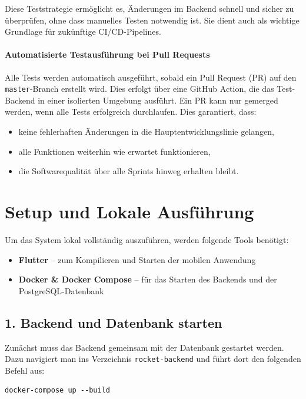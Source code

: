 \documentclass[11pt,a4paper]{article}
\begin{document}
Diese Teststrategie ermöglicht es, Änderungen im Backend schnell und sicher zu überprüfen, ohne dass manuelles Testen notwendig ist. Sie dient auch als wichtige Grundlage für zukünftige CI/CD-Pipelines.

\paragraph{Automatisierte Testausführung bei Pull Requests}
Alle Tests werden automatisch ausgeführt, sobald ein Pull Request (PR) auf den \texttt{master}-Branch erstellt wird. Dies erfolgt über eine GitHub Action, die das Test-Backend in einer isolierten Umgebung ausführt. Ein PR kann nur gemerged werden, wenn alle Tests erfolgreich durchlaufen. Dies garantiert, dass:
\begin{itemize}
    \item keine fehlerhaften Änderungen in die Hauptentwicklungslinie gelangen,
    \item alle Funktionen weiterhin wie erwartet funktionieren,
    \item die Softwarequalität über alle Sprints hinweg erhalten bleibt.
\end{itemize}

\section{Setup und Lokale Ausführung}

Um das System lokal vollständig auszuführen, werden folgende Tools benötigt:

\begin{itemize}
    \item \textbf{Flutter} -- zum Kompilieren und Starten der mobilen Anwendung
    \item \textbf{Docker \& Docker Compose} -- für das Starten des Backends und der PostgreSQL-Datenbank
\end{itemize}

\subsection*{1. Backend und Datenbank starten}

Zunächst muss das Backend gemeinsam mit der Datenbank gestartet werden. Dazu navigiert man ins Verzeichnis \texttt{rocket-backend} und führt dort den folgenden Befehl aus:

\begin{verbatim}
docker-compose up --build
\end{verbatim}
\end{document}
